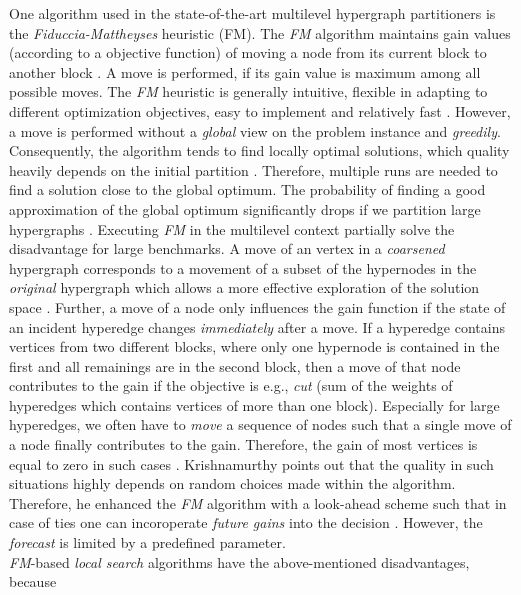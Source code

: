 One algorithm used in the state-of-the-art multilevel hypergraph partitioners is
the \emph{Fiduccia-Mattheyses} heuristic (FM). The \emph{FM} algorithm
maintains gain values (according to a objective function) of moving a node
from its current block to another block \cite{fiduccia1988linear}. A move is performed, 
if its gain value is maximum among all possible moves. The \emph{FM} heuristic is generally
intuitive, flexible in adapting to different optimization objectives, easy to implement and
relatively fast \cite{zhao2002effective}. However, a move is performed without
a \emph{global} view on the problem instance and \emph{greedily}.
Consequently, the algorithm tends to find locally optimal solutions, which quality heavily depends
on the initial partition \cite{dutt1997vlsi}. Therefore, multiple runs are needed to find
a solution close to the global optimum. The probability of finding a good approximation
of the global optimum significantly drops if we partition large hypergraphs \cite{dutt1997vlsi}. 
Executing \emph{FM} in the multilevel context partially solve the disadvantage for large benchmarks.
A move of an vertex in a \emph{coarsened} hypergraph corresponds to a movement
of a subset of the hypernodes in the \emph{original} hypergraph which allows a more 
effective exploration of the solution space \cite{papa2007hypergraph}.
Further, a move of a node only influences the gain function if the state of an incident hyperedge
changes \emph{immediately} after a move. If a hyperedge contains vertices from two different blocks,
where only one hypernode is contained in the first and all remainings are in the second block,
then a move of that node contributes to the gain if the objective is e.g., \emph{cut} 
(sum of the weights of hyperedges which contains vertices of more than one block). 
Especially for large hyperedges, we often have to \emph{move} a sequence of nodes
such that a single move of a node finally contributes to the gain.
Therefore, the gain of most vertices is equal to zero in such cases \cite{mann2014formula}. 
Krishnamurthy \cite{krishnamurthy1984improved} points out that the quality 
in such situations highly depends on random choices made within
the algorithm. Therefore, he enhanced the \emph{FM} algorithm with a look-ahead scheme
such that in case of ties one can incoroperate \emph{future gains} into the decision \cite{krishnamurthy1984improved}.
However, the \emph{forecast} is limited by a predefined parameter. \\
\emph{FM}-based \emph{local search} algorithms have the above-mentioned disadvantages, because
